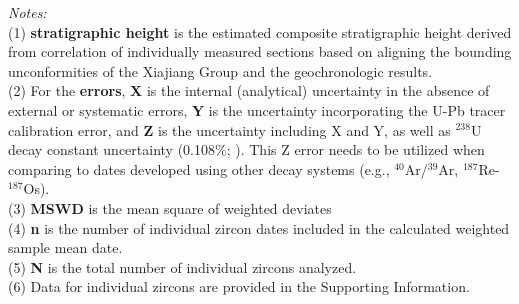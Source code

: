 \begin{table}[h!]
\scriptsize
\flushleft \emph{Notes:} \\
(1) \textbf{stratigraphic height} is the estimated composite stratigraphic height derived from correlation of individually measured sections based on aligning the bounding unconformities of the Xiajiang Group and the geochronologic results.\\
(2) For the \textbf{errors}, \textbf{X} is the internal (analytical) uncertainty in the absence of external or systematic errors, \textbf{Y} is the uncertainty incorporating the U-Pb tracer calibration error, and \textbf{Z} is the uncertainty including X and Y, as well as $^{238}$U decay constant uncertainty (0.108$\%$; \citealp{Jaffey1971a}). This Z error needs to be utilized when comparing to dates developed using other decay systems (e.g., $^{40}$Ar/$^{39}$Ar, $^{187}$Re-$^{187}$Os).\\
(3) \textbf{MSWD} is the mean square of weighted deviates\\
(4) \textbf{n} is the number of individual zircon dates included in the calculated weighted sample mean date.\\
(5) \textbf{N} is the total number of individual zircons analyzed.\\
(6) Data for individual zircons are provided in the Supporting Information.
\label{tab:SChina-geochronology}
\end{table}

